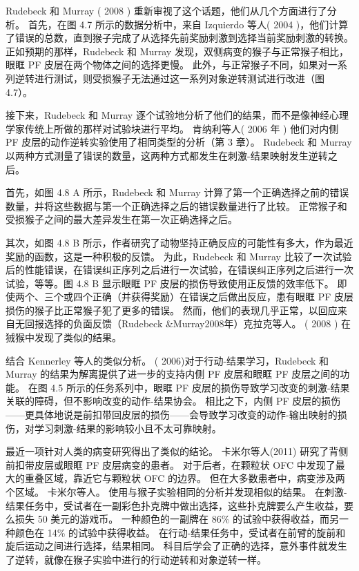Rudebeck 和 Murray ( 2008 ) 重新审视了这个话题，他们从几个方面进行了分析。 首先，在图 4.7 所示的数据分析中，来自 Izquierdo 等人( 2004 )，他们计算了错误的总数，直到猴子完成了从选择先前奖励刺激到选择当前奖励刺激的转换。 正如预期的那样，Rudebeck 和 Murray 发现，双侧病变的猴子与正常猴子相比，眼眶 PF 皮层在两个物体之间的选择更慢。 此外，与正常猴子不同，如果对一系列逆转进行测试，则受损猴子无法通过这一系列对象逆转测试进行改进（图 4.7）。\par
接下来，Rudebeck 和 Murray 逐个试验地分析了他们的结果，而不是像神经心理学家传统上所做的那样对试验块进行平均。 肯纳利等人( 2006 年 ) 他们对内侧 PF 皮层的动作逆转实验使用了相同类型的分析（第 3 章）。 Rudebeck 和 Murray 以两种方式测量了错误的数量，这两种方式都发生在刺激-结果映射发生逆转之后。\par
首先，如图 4.8 A 所示，Rudebeck 和 Murray 计算了第一个正确选择之前的错误数量，并将这些数据与第一个正确选择之后的错误数量进行了比较。 正常猴子和受损猴子之间的最大差异发生在第一次正确选择之后。\par
其次，如图 4.8 B 所示，作者研究了动物坚持正确反应的可能性有多大，作为最近奖励的函数，这是一种积极的反馈。 为此，Rudebeck 和 Murray 比较了一次试验后的性能错误，在错误纠正序列之后进行一次试验，在错误纠正序列之后进行一次试验，等等。图 4.8 B 显示眼眶 PF 皮层的损伤导致使用正反馈的效率低下。 即使两个、三个或四个正确（并获得奖励）在错误之后做出反应，患有眼眶 PF 皮层损伤的猴子比正常猴子犯了更多的错误。 然而，他们的表现几乎正常，以回应来自无回报选择的负面反馈（Rudebeck \&Murray2008年）克拉克等人。 ( 2008 ) 在狨猴中发现了类似的结果。\par
结合 Kennerley 等人的类似分析。 ( 2006)对于行动-结果学习，Rudebeck 和 Murray 的结果为解离提供了进一步的支持内侧 PF 皮层和眼眶 PF 皮层之间的功能。 在图 4.5 所示的任务系列中，眼眶 PF 皮层的损伤导致学习改变的刺激-结果关联的障碍，但不影响改变的动作-结果协会。 相比之下，内侧 PF 皮层的损伤——更具体地说是前扣带回皮层的损伤——会导致学习改变的动作-输出映射的损伤，对学习刺激-结果的影响较小且不太可靠映射。\par
最近一项针对人类的病变研究得出了类似的结论。 卡米尔等人(2011) 研究了背侧前扣带皮层或眼眶 PF 皮层病变的患者。 对于后者，在颗粒状 OFC 中发现了最大的重叠区域，靠近它与颗粒状 OFC 的边界。 但在大多数患者中，病变涉及两个区域。 卡米尔等人。 使用与猴子实验相同的分析并发现相似的结果。 在刺激-结果任务中，受试者在一副彩色扑克牌中做出选择，这些扑克牌要么产生收益，要么损失 50 美元的游戏币。 一种颜色的一副牌在 86\% 的试验中获得收益，而另一种颜色在 14\% 的试验中获得收益。 在行动-结果任务中，受试者在前臂的旋前和旋后运动之间进行选择，结果相同。 科目后学会了正确的选择，意外事件就发生了逆转，就像在猴子实验中进行的行动逆转和对象逆转一样。\par
